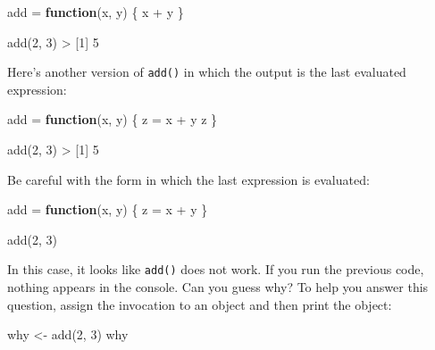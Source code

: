 \documentclass[
]{book}
\newenvironment{Shaded}{\begin{snugshade}}{\end{snugshade}}
\newcommand{\ControlFlowTok}[1]{\textcolor[rgb]{0.13,0.29,0.53}{\textbf{#1}}}
\newcommand{\DecValTok}[1]{\textcolor[rgb]{0.00,0.00,0.81}{#1}}
\newcommand{\FunctionTok}[1]{\textcolor[rgb]{0.00,0.00,0.00}{#1}}
\newcommand{\NormalTok}[1]{#1}
\newcommand{\OtherTok}[1]{\textcolor[rgb]{0.56,0.35,0.01}{#1}}
\newcommand{\SpecialCharTok}[1]{\textcolor[rgb]{0.00,0.00,0.00}{#1}}
\begin{document}
\begin{Shaded}
\begin{Highlighting}[]
\NormalTok{add }\OtherTok{=} \ControlFlowTok{function}\NormalTok{(x, y) \{}
\NormalTok{  x }\SpecialCharTok{+}\NormalTok{ y}
\NormalTok{\}}

\FunctionTok{add}\NormalTok{(}\DecValTok{2}\NormalTok{, }\DecValTok{3}\NormalTok{)}
\SpecialCharTok{\textgreater{}}\NormalTok{ [}\DecValTok{1}\NormalTok{] }\DecValTok{5}
\end{Highlighting}
\end{Shaded}

Here's another version of \texttt{add()} in which the output is the last evaluated
expression:

\begin{Shaded}
\begin{Highlighting}[]
\NormalTok{add }\OtherTok{=} \ControlFlowTok{function}\NormalTok{(x, y) \{}
\NormalTok{  z }\OtherTok{=}\NormalTok{ x }\SpecialCharTok{+}\NormalTok{ y}
\NormalTok{  z}
\NormalTok{\}}

\FunctionTok{add}\NormalTok{(}\DecValTok{2}\NormalTok{, }\DecValTok{3}\NormalTok{)}
\SpecialCharTok{\textgreater{}}\NormalTok{ [}\DecValTok{1}\NormalTok{] }\DecValTok{5}
\end{Highlighting}
\end{Shaded}

Be careful with the form in which the last expression is evaluated:

\begin{Shaded}
\begin{Highlighting}[]
\NormalTok{add }\OtherTok{=} \ControlFlowTok{function}\NormalTok{(x, y) \{}
\NormalTok{  z }\OtherTok{=}\NormalTok{ x }\SpecialCharTok{+}\NormalTok{ y}
\NormalTok{\}}

\FunctionTok{add}\NormalTok{(}\DecValTok{2}\NormalTok{, }\DecValTok{3}\NormalTok{)}
\end{Highlighting}
\end{Shaded}

In this case, it looks like \texttt{add()} does not work. If you run the previous
code, nothing appears in the console. Can you guess why? To help you answer
this question, assign the invocation to an object and then print the object:

\begin{Shaded}
\begin{Highlighting}[]
\NormalTok{why }\OtherTok{\textless{}{-}} \FunctionTok{add}\NormalTok{(}\DecValTok{2}\NormalTok{, }\DecValTok{3}\NormalTok{)}
\NormalTok{why}
\end{Highlighting}
\end{Shaded}
\end{document}
